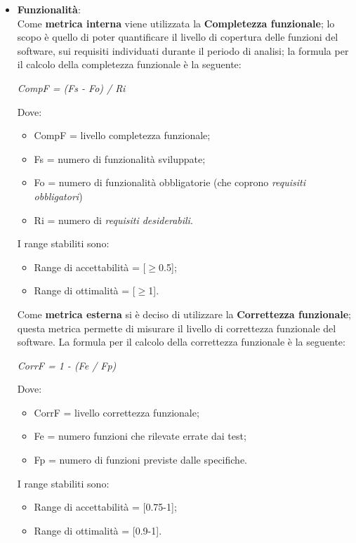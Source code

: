     \begin{itemize}
      \item \textbf{Funzionalità}:\\
      Come \textbf{metrica interna} viene utilizzata la \textbf{Completezza funzionale};
      lo scopo è quello di poter quantificare il livello di copertura delle funzioni del software, sui requisiti individuati durante il periodo di analisi;
      la formula per il calcolo della completezza funzionale è la seguente:
      \begin{center}
        \emph{CompF = (Fs - Fo) / Ri}
      \end{center}
      Dove:
      \begin{itemize}
        \item CompF = livello completezza funzionale;
        \item Fs = numero di funzionalità sviluppate;
        \item Fo = numero di funzionalità obbligatorie (che coprono \emph{requisiti obbligatori})
        \item Ri = numero di \emph{requisiti desiderabili}.
      \end{itemize}
      I range stabiliti sono:
      \begin{itemize}
        \item Range di accettabilità = [\(\geq\)0.5];
        \item Range di ottimalità = [\(\geq\)1].
      \end{itemize}
      Come \textbf{metrica esterna} si è deciso di utilizzare la \textbf{Correttezza funzionale};
      questa metrica permette di misurare il livello di correttezza funzionale del software.
      La formula per il calcolo della correttezza funzionale è la seguente:
      \begin{center}
        \emph{CorrF = 1 - (Fe / Fp)}
      \end{center}
      Dove:
      \begin{itemize}
        \item CorrF = livello correttezza funzionale;
        \item Fe = numero funzioni che rilevate errate dai test;
        \item Fp = numero di funzioni previste dalle specifiche.
      \end{itemize}
      I range stabiliti sono:
      \begin{itemize}
        \item Range di accettabilità = [0.75-1];
        \item Range di ottimalità = [0.9-1].

\end{itemize}
\end{itemize}
